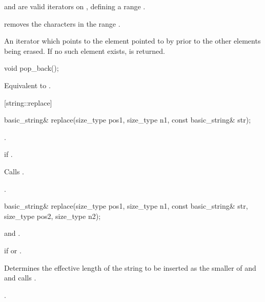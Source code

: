 \begin{itemdescr}
\pnum
\requires
{} and  are valid iterators on
,
defining a range
\tcode{[first,last)}.

\pnum
\effects
removes the characters in the range
\tcode{[first,last)}.

\pnum
\returns
An iterator which points to the element pointed to by  prior to
the other elements being erased.
If no such element exists,
is returned.
\end{itemdescr}

%
%
\begin{itemdecl}
void pop_back();
\end{itemdecl}

\begin{itemdescr}
\pnum
\requires
{}

\pnum
\effects
Equivalent to .
\end{itemdescr}

[string::replace]{}

%
%
\begin{itemdecl}
basic_string&
  replace(size_type pos1, size_type n1,
          const basic_string& str);
\end{itemdecl}

\begin{itemdescr}
\pnum
\requires {}.

\pnum
\throws {} if .

\pnum
\effects Calls .

\pnum
\returns
{}.
\end{itemdescr}

%
%
\begin{itemdecl}
basic_string&
  replace(size_type pos1, size_type n1,
          const basic_string& str,
          size_type pos2, size_type n2);
\end{itemdecl}

\begin{itemdescr}
\pnum
\requires
{} and .

\pnum
\throws
{}
if
or
.

\pnum
\effects
Determines the effective length  of the string to be inserted
as the smaller of  and  and calls
.

\pnum
\returns
{}.
\end{itemdescr}

